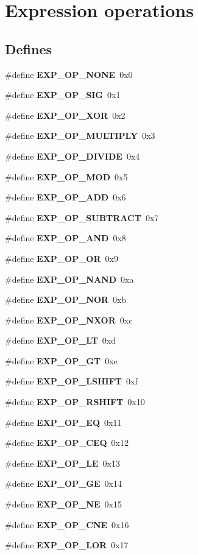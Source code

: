 \section{Expression operations}
\label{group__expr__ops}
\subsection*{Defines}
\begin{CompactItemize}
\item 
\#define {\bf EXP\_\-OP\_\-NONE}\ 0x0
\item 
\#define {\bf EXP\_\-OP\_\-SIG}\ 0x1
\item 
\#define {\bf EXP\_\-OP\_\-XOR}\ 0x2
\item 
\#define {\bf EXP\_\-OP\_\-MULTIPLY}\ 0x3
\item 
\#define {\bf EXP\_\-OP\_\-DIVIDE}\ 0x4
\item 
\#define {\bf EXP\_\-OP\_\-MOD}\ 0x5
\item 
\#define {\bf EXP\_\-OP\_\-ADD}\ 0x6
\item 
\#define {\bf EXP\_\-OP\_\-SUBTRACT}\ 0x7
\item 
\#define {\bf EXP\_\-OP\_\-AND}\ 0x8
\item 
\#define {\bf EXP\_\-OP\_\-OR}\ 0x9
\item 
\#define {\bf EXP\_\-OP\_\-NAND}\ 0xa
\item 
\#define {\bf EXP\_\-OP\_\-NOR}\ 0xb
\item 
\#define {\bf EXP\_\-OP\_\-NXOR}\ 0xc
\item 
\#define {\bf EXP\_\-OP\_\-LT}\ 0xd
\item 
\#define {\bf EXP\_\-OP\_\-GT}\ 0xe
\item 
\#define {\bf EXP\_\-OP\_\-LSHIFT}\ 0xf
\item 
\#define {\bf EXP\_\-OP\_\-RSHIFT}\ 0x10
\item 
\#define {\bf EXP\_\-OP\_\-EQ}\ 0x11
\item 
\#define {\bf EXP\_\-OP\_\-CEQ}\ 0x12
\item 
\#define {\bf EXP\_\-OP\_\-LE}\ 0x13
\item 
\#define {\bf EXP\_\-OP\_\-GE}\ 0x14
\item 
\#define {\bf EXP\_\-OP\_\-NE}\ 0x15
\item 
\#define {\bf EXP\_\-OP\_\-CNE}\ 0x16
\item 
\#define {\bf EXP\_\-OP\_\-LOR}\ 0x17
\item 

\end{CompactItemize}
